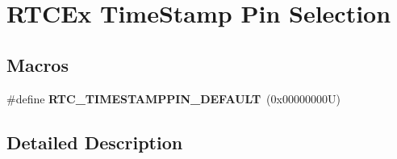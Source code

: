 \hypertarget{group___r_t_c_ex___time_stamp___pin___selections}{}\section{R\+T\+C\+Ex Time\+Stamp Pin Selection}
\label{group___r_t_c_ex___time_stamp___pin___selections}
\subsection*{Macros}
\begin{DoxyCompactItemize}
\item 
\mbox{\label{group___r_t_c_ex___time_stamp___pin___selections_ga8ce8bdb904f1fef05ae3b59d6f59843a}} 
\#define {\bfseries R\+T\+C\+\_\+\+T\+I\+M\+E\+S\+T\+A\+M\+P\+P\+I\+N\+\_\+\+D\+E\+F\+A\+U\+LT}~(0x00000000\+U)
\end{DoxyCompactItemize}


\subsection{Detailed Description}
